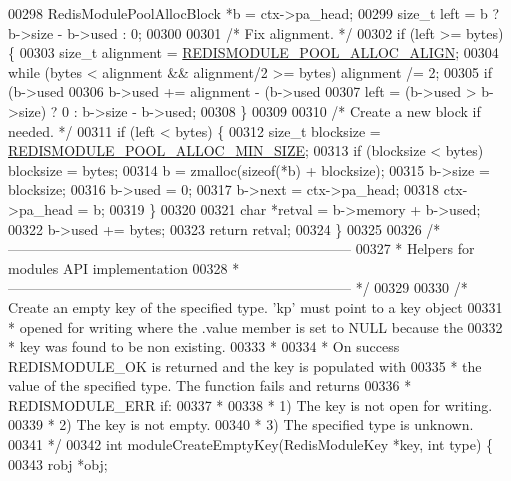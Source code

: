 \begin{DoxyCode}
00298     RedisModulePoolAllocBlock *b = ctx->pa\_head;
00299     size\_t left = b ? b->size - b->used : 0;
00300 
00301     \textcolor{comment}{/* Fix alignment. */}
00302     \textcolor{keywordflow}{if} (left >= bytes) \{
00303         size\_t alignment = \hyperlink{module_8c_aea20ee5f4dfeeaa2ae088904127efc2c}{REDISMODULE\_POOL\_ALLOC\_ALIGN};
00304         \textcolor{keywordflow}{while} (bytes < alignment && alignment/2 >= bytes) alignment /= 2;
00305         \textcolor{keywordflow}{if} (b->used %
00306             b->used += alignment - (b->used %
00307         left = (b->used > b->size) ? 0 : b->size - b->used;
00308     \}
00309 
00310     \textcolor{comment}{/* Create a new block if needed. */}
00311     \textcolor{keywordflow}{if} (left < bytes) \{
00312         size\_t blocksize = \hyperlink{module_8c_ae7dda44c0d73e50e241dd638550c4e18}{REDISMODULE\_POOL\_ALLOC\_MIN\_SIZE};
00313         \textcolor{keywordflow}{if} (blocksize < bytes) blocksize = bytes;
00314         b = zmalloc(\textcolor{keyword}{sizeof}(*b) + blocksize);
00315         b->size = blocksize;
00316         b->used = 0;
00317         b->next = ctx->pa\_head;
00318         ctx->pa\_head = b;
00319     \}
00320 
00321     \textcolor{keywordtype}{char} *retval = b->memory + b->used;
00322     b->used += bytes;
00323     \textcolor{keywordflow}{return} retval;
00324 \}
00325 
00326 \textcolor{comment}{/* --------------------------------------------------------------------------}
00327 \textcolor{comment}{ * Helpers for modules API implementation}
00328 \textcolor{comment}{ * -------------------------------------------------------------------------- */}
00329 
00330 \textcolor{comment}{/* Create an empty key of the specified type. 'kp' must point to a key object}
00331 \textcolor{comment}{ * opened for writing where the .value member is set to NULL because the}
00332 \textcolor{comment}{ * key was found to be non existing.}
00333 \textcolor{comment}{ *}
00334 \textcolor{comment}{ * On success REDISMODULE\_OK is returned and the key is populated with}
00335 \textcolor{comment}{ * the value of the specified type. The function fails and returns}
00336 \textcolor{comment}{ * REDISMODULE\_ERR if:}
00337 \textcolor{comment}{ *}
00338 \textcolor{comment}{ * 1) The key is not open for writing.}
00339 \textcolor{comment}{ * 2) The key is not empty.}
00340 \textcolor{comment}{ * 3) The specified type is unknown.}
00341 \textcolor{comment}{ */}
00342 \textcolor{keywordtype}{int} moduleCreateEmptyKey(RedisModuleKey *key, \textcolor{keywordtype}{int} type) \{
00343     robj *obj;

\end{DoxyCode}
